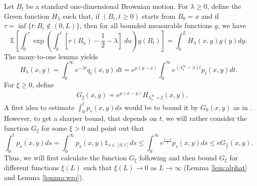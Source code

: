 \documentclass[11pt]{article}
\theoremstyle{plain}
\newcommand\linf{\lambda_1^\infty}
\begin{document}
Let $B_t$ be a standard one-dimensional Brownian motion. For $\lambda\geq0$, define the Green function $H_\lambda$ such that, if $(B_t,t\geq0)$  starts from $B_0=x$ and if $\tau=\inf\{t:B_t\notin (0,L)\}$, then for all bounded measurable functions $g$, we have 
\begin{equation*}
\mathbb{E}\left[\int_0^\tau  \exp\left(\int_0^t\left[r(B_u)-\frac{1}{2}-\lambda\right]\;du\right)g(B_t)\right]=\int_0^LH_\lambda(x,y)g(y)dy.
\end{equation*}
The many-to-one lemma  yields
\begin{equation*}
H_\lambda(x,y)=\int_0^\infty e^{-\lambda t} q_t(x,y)\,dt=e^{\mu(y-x)}\int_0^\infty e^{(\linf-\lambda) t}p_t(x,y)dt.
\end{equation*}
For $\xi\geq 0$, define
\begin{eqnarray}\label{def:GH}
 \quad G_\xi(x,y) = e^{\mu(x-y)}H_{\linf+\xi}(x,y).
\end{eqnarray}
A first idea to estimate  $
\int_0^tp_s(x,y)ds $
 would be to bound it by $G_0(x,y)$ as in \cite{Berestycki2010}.
However, to get a sharper bound, that depends on $t$, we will rather consider the function $G_\xi$ for some $\xi>0$ and point out that
\begin{equation}\label{rk:green}
\int_0^tp_s(x,y)ds=\int_0^\infty p_s(x,y)\mathbb{1}_{s\in[0,t]}ds\leqslant \int_0^\infty e^{\frac{t-s}{t}}p_s(x,y)ds\leqslant e G_{\frac{1}{t}} (x,y).
\end{equation}
Thus, we will first calculate the function $G_\xi$ following   \cite[Chapter II]{Borodin:2012aa} and then bound $G_\xi$ for different functions $\xi(L)$ such that $\xi(L)\to 0$ as $L\to \infty$ (Lemma \ref{lem:alphat} and Lemma \ref{lemma:wro}).
\end{document}
